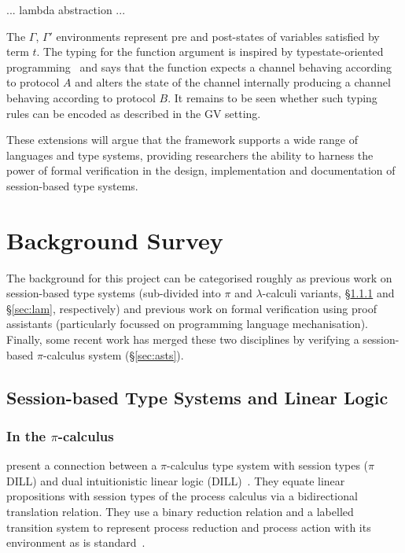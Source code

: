 \documentclass{mprop}
\newcommand{\1}{\textbf{1}\xspace}
\begin{document}
... lambda abstraction ...

The $\Gamma$, $\Gamma '$ environments represent pre and post-states of variables satisfied by term $t$. The typing for the function argument is inspired by typestate-oriented programming~\cite{Aldrich:2009} and says that the function expects a channel behaving according to protocol $A$ and alters the state of the channel internally producing a channel behaving according to protocol $B$. It remains to be seen whether such typing rules can be encoded as described in the GV setting.

These extensions will argue that the framework supports a wide range of languages and type systems, providing researchers the ability to harness the power of formal verification in the design, implementation and documentation of session-based type systems.

\section{Background Survey}


The background for this project can be categorised roughly as previous work on session-based type systems (sub-divided into $\pi$ and $\lambda$-calculi variants, \S \ref{sec:pis} and \S \ref{sec:lam}, respectively) and previous work on formal verification using proof assistants (particularly focussed on programming language mechanisation). Finally, some recent work has merged these two disciplines by verifying a session-based $\pi$-calculus system (\S \ref{sec:asts}).

\subsection{Session-based Type Systems and Linear Logic}\label{sec:sts}

\subsubsection{In the \texorpdfstring{$\pi$}{pi}-calculus}\label{sec:pis}

\citeauthor{Caires:2010:STI} \cite{Caires:2010:STI} present a connection between a $\pi$-calculus type system with session types ($\pi$DILL) and dual intuitionistic linear logic (DILL)~\cite{Barber:1996}. They equate linear propositions with session types of the process calculus via a bidirectional translation relation. They use a binary reduction relation and a labelled transition system to represent process reduction and process action with its environment as is standard~\cite{Sangiorgi:2001}.
\end{document}
